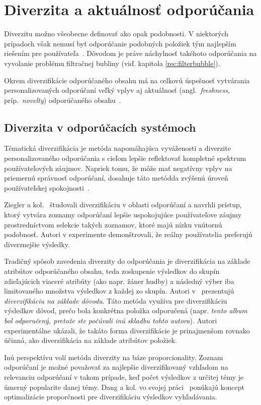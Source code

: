 \chapter{Diverzita a aktuálnosť odporúčania}

Diverzitu možno všeobecne definovať ako opak podobnosti. V niektorých prípadoch však nemusí byť odporúčanie podobných
položiek tým najlepším riešením pre používateľa~\cite{Handbook2011}. Dôvodom je práve náchylnosť takéhoto odporúčania na
vyvolanie problému filtračnej bubliny (viď. kapitola \ref{rec:filterbubble}).

Okrem diverzifikácie odporúčaného obsahu má na celkovú úspešnosť vytvárania personalizovaných odporúčaní veľký vplyv aj
aktuálnosť (angl.~\emph{freshness}, príp.~\emph{novelty}) odporúčaného obsahu~\cite{Liu2015}.

\section{Diverzita v odporúčacích systémoch}

Tématická diverzifikácia je metóda napomáhajúca vyváženosti a diverzite personalizovaného odporúčania s cieľom
lepšie reflektovať kompletné spektrum používateľových záujmov. Napriek tomu, že môže mať negatívny vplyv na priemernú
správnosť odporúčaní, dosahuje táto metódda zvýšenú úroveň používateľskej spokojnosti~\cite{Zhang2009}.

Ziegler a kol.~\cite{Ziegler2005} študovali diverzifikáciu v oblasti odporúčaní a navrhli prístup, ktorý vytvára
zoznamy odporúčaní lepšie uspokojujúce používateľove záujmy prostredníctvom selekcie takých zoznamov, ktoré majú nízku
vnútornú podobnosť. Autori v experimente demonštrovali, že reálny používatelia preferujú diverznejšie výsledky.

Tradičný spôsob zavedenia diverzity do odporúčania je diverzifikácia na základe atribútov odporúčaného obsahu, teda
zoskupenie výsledkov do skupín zdieľajúcich viaceré atribúty (ako napr. žáner hudby) a následný výber iba limitovaného
množstva výsledkov z každej zo skupín. Autori v~\cite{Yu2009} prezentujú \emph{diverzifikáciu na základe dôvodu}.
Táto metóda využíva pre diverzifikáciu výsledkov dôvod, prečo bola konkrétna položka odporučená
(napr. \textit{tento album bol odporučený, pretože ste počúvali inú skladbu tohto autora}). Autori experimentálne ukázali,
že takáto forma diverzifikácie je prinajmenšom rovnako účinná, ako diverzifikácia na základe atribútov položiek.

Inú perspektívu volí metóda diverzity na báze proporcionality. Zoznam odporúčaní je možné považovať za najlepšie diverzifikovaný
vzhľadom na relevanciu odporúčaní v takom prípade, keď počet výsledkov z určitej témy je úmerný popularite danej témy.
Dang a kol. vo svojej práci~\cite{Dang2012} ponúkajú koncept optimalizácie proporčnosti pre diverzifikáciu výsledkov
vyhľadávania.

